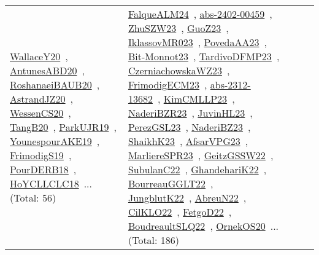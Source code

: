 {\begin{longtable}{lp{3cm}>{\raggedright\arraybackslash}p{6cm}>{\raggedright\arraybackslash}p{6cm}>{\raggedright\arraybackslash}p{8cm}}
\href{../works/WallaceY20.pdf}{WallaceY20}~\cite{WallaceY20}, \href{../works/AntunesABD20.pdf}{AntunesABD20}~\cite{AntunesABD20}, \href{../works/RoshanaeiBAUB20.pdf}{RoshanaeiBAUB20}~\cite{RoshanaeiBAUB20}, \href{../works/AstrandJZ20.pdf}{AstrandJZ20}~\cite{AstrandJZ20}, \href{../works/WessenCS20.pdf}{WessenCS20}~\cite{WessenCS20}, \href{../works/TangB20.pdf}{TangB20}~\cite{TangB20}, \href{../works/ParkUJR19.pdf}{ParkUJR19}~\cite{ParkUJR19}, \href{../works/YounespourAKE19.pdf}{YounespourAKE19}~\cite{YounespourAKE19}, \href{../works/FrimodigS19.pdf}{FrimodigS19}~\cite{FrimodigS19}, \href{../works/PourDERB18.pdf}{PourDERB18}~\cite{PourDERB18}, \href{../works/HoYCLLCLC18.pdf}{HoYCLLCLC18}~\cite{HoYCLLCLC18}... (Total: 56) & \href{../works/FalqueALM24.pdf}{FalqueALM24}~\cite{FalqueALM24}, \href{../works/abs-2402-00459.pdf}{abs-2402-00459}~\cite{abs-2402-00459}, \href{../works/ZhuSZW23.pdf}{ZhuSZW23}~\cite{ZhuSZW23}, \href{../works/GuoZ23.pdf}{GuoZ23}~\cite{GuoZ23}, \href{../works/IklassovMR023.pdf}{IklassovMR023}~\cite{IklassovMR023}, \href{../works/PovedaAA23.pdf}{PovedaAA23}~\cite{PovedaAA23}, \href{../works/Bit-Monnot23.pdf}{Bit-Monnot23}~\cite{Bit-Monnot23}, \href{../works/TardivoDFMP23.pdf}{TardivoDFMP23}~\cite{TardivoDFMP23}, \href{../works/CzerniachowskaWZ23.pdf}{CzerniachowskaWZ23}~\cite{CzerniachowskaWZ23}, \href{../works/FrimodigECM23.pdf}{FrimodigECM23}~\cite{FrimodigECM23}, \href{../works/abs-2312-13682.pdf}{abs-2312-13682}~\cite{abs-2312-13682}, \href{../works/KimCMLLP23.pdf}{KimCMLLP23}~\cite{KimCMLLP23}, \href{../works/NaderiBZR23.pdf}{NaderiBZR23}~\cite{NaderiBZR23}, \href{../works/JuvinHL23.pdf}{JuvinHL23}~\cite{JuvinHL23}, \href{../works/PerezGSL23.pdf}{PerezGSL23}~\cite{PerezGSL23}, \href{../works/NaderiBZ23.pdf}{NaderiBZ23}~\cite{NaderiBZ23}, \href{../works/ShaikhK23.pdf}{ShaikhK23}~\cite{ShaikhK23}, \href{../works/AfsarVPG23.pdf}{AfsarVPG23}~\cite{AfsarVPG23}, \href{../works/MarliereSPR23.pdf}{MarliereSPR23}~\cite{MarliereSPR23}, \href{../works/GeitzGSSW22.pdf}{GeitzGSSW22}~\cite{GeitzGSSW22}, \href{../works/SubulanC22.pdf}{SubulanC22}~\cite{SubulanC22}, \href{../works/GhandehariK22.pdf}{GhandehariK22}~\cite{GhandehariK22}, \href{../works/BourreauGGLT22.pdf}{BourreauGGLT22}~\cite{BourreauGGLT22}, \href{../works/JungblutK22.pdf}{JungblutK22}~\cite{JungblutK22}, \href{../works/AbreuN22.pdf}{AbreuN22}~\cite{AbreuN22}, \href{../works/CilKLO22.pdf}{CilKLO22}~\cite{CilKLO22}, \href{../works/FetgoD22.pdf}{FetgoD22}~\cite{FetgoD22}, \href{../works/BoudreaultSLQ22.pdf}{BoudreaultSLQ22}~\cite{BoudreaultSLQ22}, \href{../works/OrnekOS20.pdf}{OrnekOS20}~\cite{OrnekOS20}... (Total: 186)\\

\end{longtable}}
